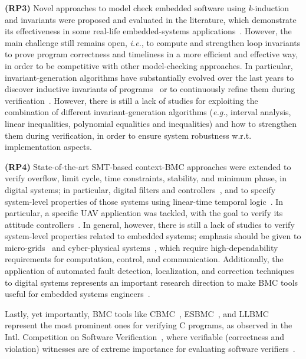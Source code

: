 \documentclass{acm_sen_article}
\begin{document}
\textbf{(RP3)} Novel approaches to model check embedded software using \textit{k}-induction and invariants were proposed and evaluated in the literature, which demonstrate its effectiveness in some real-life embedded-systems applications~\cite{Gadelha15,Brain15,Rocha15}. However, the main challenge still remains open, {\it i.e.}, to compute and strengthen loop invariants to prove program correctness and timeliness in a more efficient and effective way, in order to be competitive with other model-checking approaches. In particular, invariant-generation algorithms have substantially evolved over the last years to discover inductive invariants of programs~\cite{pips:2013,Henry:2012} or to continuously refine them during verification~\cite{Beyer15}. However, there is still a lack of studies for exploiting the combination of different invariant-generation algorithms ({\it e.g.}, interval analysis, linear inequalities, polynomial equalities and inequalities) and how to strengthen them during verification, in order to ensure system robustness w.r.t. implementation aspects.

\textbf{(RP4)} State-of-the-art SMT-based context-BMC approaches were extended to verify overflow, limit cycle, time constraints, stability, and minimum phase, in digital systems; in particular, digital filters and controllers~\cite{dsv_spin2015,esbmc_controller,esbmc_filter}, and to specify system-level properties of those systems using linear-time temporal logic~\cite{JMorse15}. In particular, a specific UAV application was tackled, with the goal to verify its attitude controllers~\cite{Bessa16}. In general, however, there is still a lack of studies to verify system-level properties related to embedded systems; emphasis should be given to micro-grids~\cite{xu15} and cyber-physical systems~\cite{leeCPS2}, which require high-dependability requirements for computation, control, and communication. Additionally, the application of automated fault detection, localization, and correction techniques to digital systems represents an important research direction to make BMC tools useful for embedded systems engineers~\cite{Alves15}.

Lastly, yet importantly, BMC tools like CBMC~\cite{Clarke04}, ESBMC~\cite{MorseCNF13,MorseRCN014}, and LLBMC~\cite{MerzFS12} represent the most prominent ones for verifying C programs, as observed in the Intl. Competition on Software Verification~\cite{Beyer14,BeyerSVCOMP15}, where verifiable (correctness and violation) witnesses are of extreme importance for evaluating software verifiers~\cite{BeyerW15,RochaIFM12}.
\end{document}
